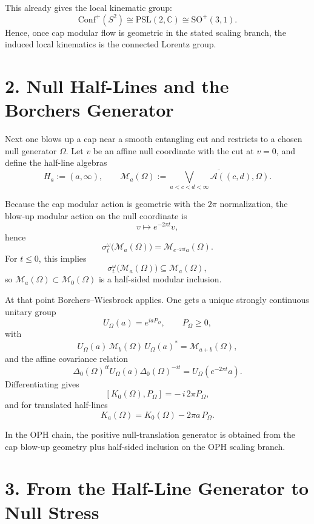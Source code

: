 \documentclass[10pt]{article}
\newcommand{\Conf}{\mathrm{Conf}}
\begin{document}
This already gives the local kinematic group:
\[
\Conf^+(S^2) \cong \mathrm{PSL}(2,\mathbb C) \cong \mathrm{SO}^+(3,1).
\]
Hence, once cap modular flow is geometric in the stated scaling branch, the induced local kinematics is the connected Lorentz group.

\section*{2. Null Half-Lines and the Borchers Generator}

Next one blows up a cap near a smooth entangling cut and restricts to a chosen null generator \(\Omega\). Let \(v\) be an affine null coordinate with the cut at \(v=0\), and define the half-line algebras
\[
H_a := (a,\infty),
\qquad
\mathcal M_a(\Omega)
:=
\overline{\bigvee_{a<c<d<\infty}\mathcal A((c,d),\Omega)}.
\]

Because the cap modular action is geometric with the \(2\pi\) normalization, the blow-up modular action on the null coordinate is
\[
v \mapsto e^{-2\pi t} v,
\]
hence
\[
\sigma_t^\omega\bigl(\mathcal M_a(\Omega)\bigr)
=
\mathcal M_{e^{-2\pi t}a}(\Omega).
\]
For \(t \le 0\), this implies
\[
\sigma_t^\omega\bigl(\mathcal M_a(\Omega)\bigr) \subseteq \mathcal M_a(\Omega),
\]
so \(\mathcal M_a(\Omega) \subset \mathcal M_0(\Omega)\) is a half-sided modular inclusion.

At that point Borchers--Wiesbrock applies. One gets a unique strongly continuous unitary group
\[
U_\Omega(a) = e^{i a P_\Omega},
\qquad
P_\Omega \ge 0,
\]
with
\[
U_\Omega(a)\,\mathcal M_b(\Omega)\,U_\Omega(a)^* = \mathcal M_{a+b}(\Omega),
\]
and the affine covariance relation
\[
\Delta_0(\Omega)^{it} U_\Omega(a)\Delta_0(\Omega)^{-it}
=
U_\Omega(e^{-2\pi t} a).
\]
Differentiating gives
\[
[K_0(\Omega),P_\Omega] = -\,i\,2\pi P_\Omega,
\]
and for translated half-lines
\[
K_a(\Omega)=K_0(\Omega)-2\pi a\,P_\Omega.
\]

In the OPH chain, the positive null-translation generator is obtained from the cap blow-up geometry plus half-sided inclusion on the OPH scaling branch.

\section*{3. From the Half-Line Generator to Null Stress}
\end{document}
